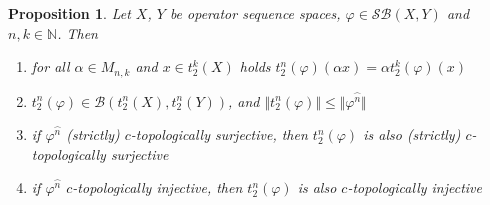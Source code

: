 \documentclass[12pt]{article}
\newtheorem{proposition}[theorem]{Proposition}
\begin{document}
\begin{proposition}\label{PrT2nOfOpIsWellDef}
Let $X$, $Y$ be operator sequence spaces, 
$\varphi\in\mathcal{SB}(X,Y)$ and $n,k\in\mathbb{N}$. Then 
\begin{enumerate}[label = (\roman*)]
    \item for all $\alpha\in M_{n,k}$ and $x\in t_2^k(X)$ holds 
    $t_2^n(\varphi)(\alpha x)=\alpha t_2^k(\varphi)(x)$
 

    \item $t_2^n(\varphi)\in\mathcal{B}(t_2^n(X),t_2^n(Y))$, and 
    $\Vert t_2^n(\varphi)\Vert\leq\Vert\varphi^{\wideparen{n}}\Vert$

    \item if $\varphi^{\wideparen{n}}$ (strictly) $c$-topologically surjective, 
    then $t_2^n(\varphi)$ is also (strictly) $c$-topologically surjective

    \item if $\varphi^{\wideparen{n}}$ $c$-topologically injective, then 
    $t_2^n(\varphi)$ is also $c$-topologically injective
\end{enumerate}
\end{proposition}
\end{document}
